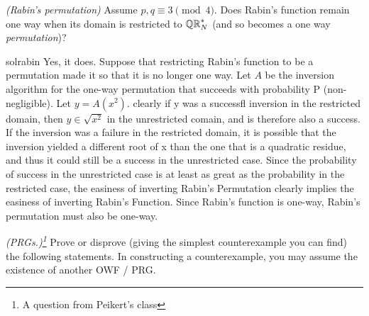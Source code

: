 \begin{questions}





  \question[3] \emph{(Rabin's permutation)}
	  Assume $p,q \equiv 3  \pmod 4$. Does Rabin's function remain one way when its domain is restricted to $\mathbb{QR}_{N}^*$ (and so becomes
		a one way \emph{permutation})?
    \begin{mysolution}{solrabin}
     Yes, it does. Suppose that restricting Rabin's function to be a permutation made it so that it is no longer one way. Let $A$
      be the inversion algorithm for the one-way permutation that succeeds with probability P (non-negligible). Let $y=A(x^2)$. clearly if y was a successfl inversion in the restricted domain, then $y \in \sqrt{x^2}$ in the unrestricted comain, and is therefore also a success. If the inversion was a failure in the restricted domain, it is possible that the inversion yielded a different root of x than the one that is a quadratic residue, and thus it could still be a success in the unrestricted case. Since the probability of success in the unrestricted case is at least as great as the probability in the restricted case, the easiness of inverting Rabin's Permutation clearly implies the easiness of inverting Rabin's Function. Since Rabin's function is one-way, Rabin's permutation must also be one-way.
       \end{mysolution}





  \question \emph{(PRGs.)\footnote{A question from Peikert's class\label{fn:peikert}}}  Prove or
  disprove (giving the simplest counterexample you can find) the
  following statements.  In constructing a counterexample, you may
  assume the existence of another OWF / PRG.

  \begin{parts}

\end{parts}
\end{questions}
